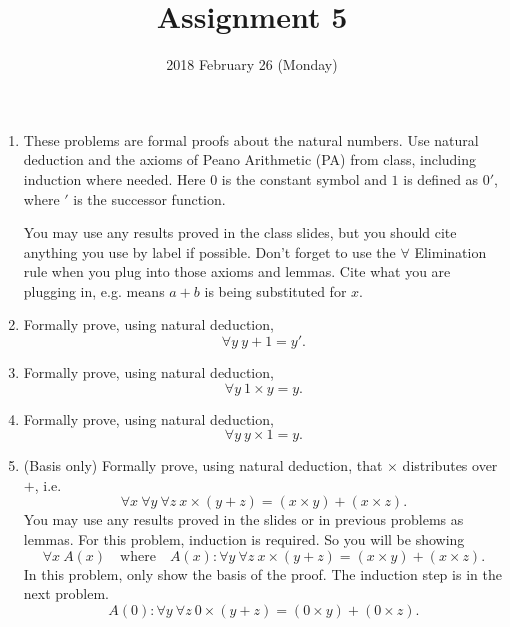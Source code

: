 \documentclass{cs81-homework}
\title{Assignment 5}
\author{}
\date{2018 February 26 (Monday)}
\begin{document}
\begin{introduction}
  \theintroduction
\end{introduction}

\begin{enumerate}

\item[] These problems are formal proofs about the natural numbers. Use natural
  deduction and the axioms of Peano Arithmetic (PA) from class, including
  induction where needed.  Here \(0\) is the constant symbol and \(1\) is
  defined as \(0'\), where \('\) is the successor function.

  You may use any results proved in the class slides, but you should cite
  anything you use by label if possible.  Don't forget to use the \(\forall\)
  Elimination rule when you plug into those axioms and lemmas.  Cite what you
  are plugging in, e.g.  means \(a+b\) is being substituted for
  \(x\).
  
\item {} Formally prove, using natural deduction,
  \[
    \forall y \: y + 1 = y'.
  \]
    
  \begin{solution}
  \end{solution}

\item {} Formally prove, using natural deduction,
  \[
    \forall y \: 1 \times y = y.
  \]
  
  \begin{solution}
  \end{solution}

\item {} Formally prove, using natural deduction,
  \[
    \forall y \: y \times 1 = y.
  \]

  \begin{solution}
  \end{solution}

\item {} (Basis only) Formally prove, using natural deduction, that
  \(\times\) distributes over \(+\), i.e.
  \[
    \forall x \: \forall y \: \forall z \: x \times (y + z) = (x \times y) + (x
    \times z).
  \]
  You may use any results proved in the slides or in previous problems as
  lemmas.  For this problem, induction is required.  So you will be showing
  \[
    \forall x \: A(x) \quad \text{where} \quad A(x)\colon \forall y \: \forall z
    \: x \times (y + z) = (x \times y) + (x \times z).
  \]
  In this problem, only show the basis of the proof.  The induction step is in
  the next problem.
  \[
    A(0)\colon \forall y \: \forall z \: 0 \times (y + z) = (0 \times y) + (0
    \times z).
  \]


\end{enumerate}
\end{document}
